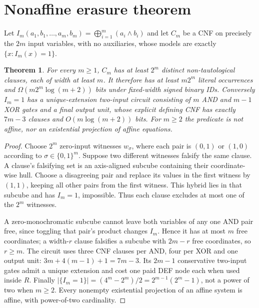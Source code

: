 \documentclass[11pt]{article}
\newtheorem{theorem}{Theorem}
\begin{document}
\section*{Nonaffine erasure theorem}
Let $I_m(a_1,b_1,\dots,a_m,b_m)=\bigoplus_{i=1}^m(a_i\wedge b_i)$ and let $C_m$ be a CNF on precisely the $2m$ input variables, with no auxiliaries, whose models are exactly $\{x:I_m(x)=1\}$.
\begin{theorem}
For every $m\ge1$, $C_m$ has at least $2^m$ distinct non-tautological clauses, each of width at least $m$. It therefore has at least $m2^m$ literal occurrences and $\Omega(m2^m\log(m+2))$ bits under fixed-width signed binary IDs. Conversely $I_m=1$ has a unique-extension two-input circuit consisting of $m$ AND and $m-1$ XOR gates and a final output unit, whose explicit defining CNF has exactly $7m-3$ clauses and $O(m\log(m+2))$ bits. For $m\ge2$ the predicate is not affine, nor an existential projection of affine equations.
\end{theorem}
\begin{proof}
Choose $2^m$ zero-input witnesses $w_\sigma$, where each pair is $(0,1)$ or $(1,0)$ according to $\sigma\in\{0,1\}^m$. Suppose two different witnesses falsify the same clause. A clause's falsifying set is an axis-aligned subcube containing their coordinate-wise hull. Choose a disagreeing pair and replace its values in the first witness by $(1,1)$, keeping all other pairs from the first witness. This hybrid lies in that subcube and has $I_m=1$, impossible. Thus each clause excludes at most one of the $2^m$ witnesses.
\par A zero-monochromatic subcube cannot leave both variables of any one AND pair free, since toggling that pair's product changes $I_m$. Hence it has at most $m$ free coordinates; a width-$r$ clause falsifies a subcube with $2m-r$ free coordinates, so $r\ge m$. The circuit uses three CNF clauses per AND, four per XOR and one output unit: $3m+4(m-1)+1=7m-3$. Its $2m-1$ conservative two-input gates admit a unique extension and cost one paid DEF node each when used inside $R$. Finally $|\{I_m=1\}|=(4^m-2^m)/2=2^{m-1}(2^m-1)$, not a power of two when $m\ge2$. Every nonempty existential projection of an affine system is affine, with power-of-two cardinality.
\end{proof}
\end{document}
